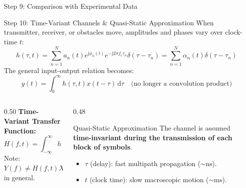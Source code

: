 \documentclass[10pt,aspectratio=169]{beamer}
\DeclareMathOperator{\FT}{\mathcal{F}}
\newcommand{\dd}{\mathrm{d}}
\newcommand{\jj}{\mathrm{j}}
\begin{document}
\begin{frame}{Step 9: Comparison with Experimental Data}
\end{frame}

\begin{frame}{Step 10: Time-Variant Channels \& Quasi-Static Approximation}
  When transmitter, receiver, or obstacles move, amplitudes and phases vary over clock-time $t$:
  \begin{equation}
    h(\tau, t) = \sum_{n=1}^{N} a_n(t) e^{\jj\phi_n(t)} e^{-\jj 2\pi f_c \tau_n} \delta(\tau - \tau_n) = \sum_{n=1}^{N} \alpha_n(t) \delta(\tau - \tau_n)
  \end{equation}
  The general input-output relation becomes:
  \begin{equation}
    y(t) = \int_{0}^{\infty} h(\tau, t) x(t - \tau) \,\dd\tau \quad \text{(no longer a convolution product)}
  \end{equation}

  \begin{columns}[T]
    \begin{column}{0.50\textwidth}
      \textbf{Time-Variant Transfer Function:}
      \begin{equation}
        H(f, t) = \int_{-\infty}^{\infty} h(\tau, t) e^{-\jj 2\pi f \tau} \,\dd\tau
      \end{equation}
      Note: $Y(f) \neq H(f, t) X(f)$ in general.
    \end{column}
    \begin{column}{0.48\textwidth}
      \begin{block}{Quasi-Static Approximation}
        The channel is assumed \textbf{time-invariant during the transmission of each block of symbols}.
        \begin{itemize}
          \item $\tau$ (delay): fast multipath propagation ($\sim \si{\nano\second}$).
          \item $t$ (clock time): slow macroscopic motion ($\sim \si{\milli\second}$).
        \end{itemize}
      \end{block}
    \end{column}
  \end{columns}
\end{frame}
\end{document}
